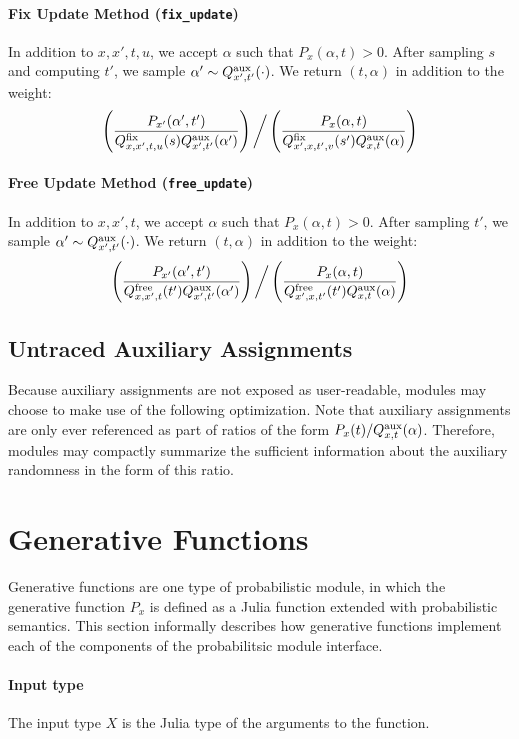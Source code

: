 \documentclass{article}
\newcommand{\code}[1]{\texttt{\small{\textbf{#1}}}}
\newcommand{\fix}[0]{\mbox{\scriptsize fix}}
\newcommand{\free}[0]{\mbox{\scriptsize free}}
\newcommand{\auxassign}[0]{\alpha}
\newcommand{\aux}[0]{\mbox{\scriptsize aux}}
\begin{document}
\paragraph{Fix Update Method (\code{fix\_update})}
In addition to $x, x', t, u$, we accept $\auxassign$ such that $P_x(\auxassign, t) > 0$.
After sampling $s$ and computing $t'$, we sample $\auxassign' \sim Q^{\aux}_{x',t'}(\cdot)$.
We return $(t, \auxassign)$ in addition to the weight:
\[
\left( \frac{P_{x'}(\auxassign', t')}{Q^{\fix}_{x,x',t,u}(s) Q^{\aux}_{x',t'}(\auxassign')} \right)
\bigg/
\left( \frac{P_x(\auxassign, t)}{Q^{\fix}_{x',x,t',v}(s') Q^{\aux}_{x,t}(\auxassign)} \right)
\]

\paragraph{Free Update Method (\code{free\_update})}
In addition to $x, x', t$, we accept $\auxassign$ such that $P_x(\auxassign, t) > 0$.
After sampling $t'$, we sample $\auxassign' \sim Q^{\aux}_{x',t'}(\cdot)$.
We return $(t, \auxassign)$ in addition to the weight:
\[
\left( \frac{P_{x'}(\auxassign', t')}{Q^{\free}_{x,x',t}(t') Q^{\aux}_{x',t'}(\auxassign')} \right)
\bigg/
\left( \frac{P_x(\auxassign, t)}{Q^{\free}_{x',x,t'}(t') Q^{\aux}_{x,t}(\auxassign)} \right)
\]

\subsection{Untraced Auxiliary Assignments}
Because auxiliary assignments are not exposed as user-readable, modules may choose to make use of the following optimization.
Note that auxiliary assignments are only ever referenced as part of ratios of the form $P_x(t) / Q^{\aux}_{x,t}(\auxassign)$.
Therefore, modules may compactly summarize the sufficient information about the auxiliary randomness in the form of this ratio.

\section{Generative Functions}
Generative functions are one type of probabilistic module, in which the generative function $P_x$ is defined as a Julia function extended with probabilistic semantics.
This section informally describes how generative functions implement each of the components of the probabilitsic module interface.

\paragraph{Input type}
The input type $X$ is the Julia type of the arguments to the function.
\end{document}
